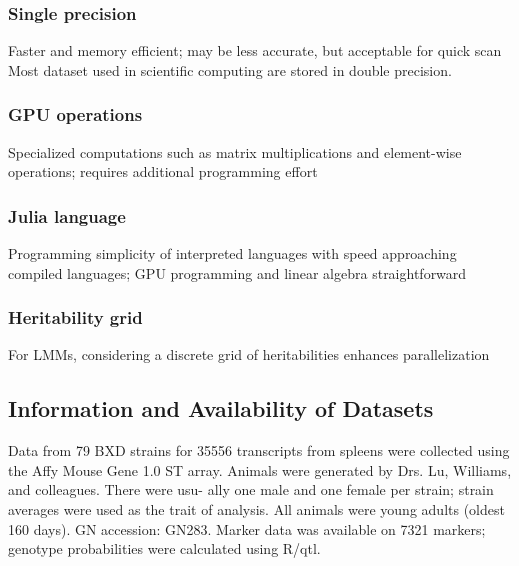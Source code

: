 \documentclass[9pt,twocolumn,twoside,lineno]{gsag3jnl}
\begin{document}
\subsubsection{Single precision}
 Faster and memory efficient; may be less accurate, but acceptable for quick scan
Most dataset used in scientific computing are stored in double precision. 


\subsubsection{GPU operations}
Specialized computations such as matrix multiplications and element-wise operations; requires additional programming effort
\subsubsection{Julia language}
Programming simplicity of interpreted languages with speed approaching compiled languages; GPU programming and linear algebra straightforward
\subsubsection{ Heritability grid}
For LMMs, considering a discrete grid of heritabilities enhances parallelization


\subsection{Information and Availability of Datasets}
Data from 79 BXD strains for 35556 transcripts from spleens were collected using the Affy Mouse Gene 1.0 ST array. Animals were generated by Drs. Lu, Williams, and colleagues. There were usu- ally one male and one female per strain; strain averages were used as the trait of analysis. All animals were young adults (oldest 160 days). GN accession: GN283. Marker data was available on 7321 markers; genotype probabilities were calculated using R/qtl.
\end{document}
